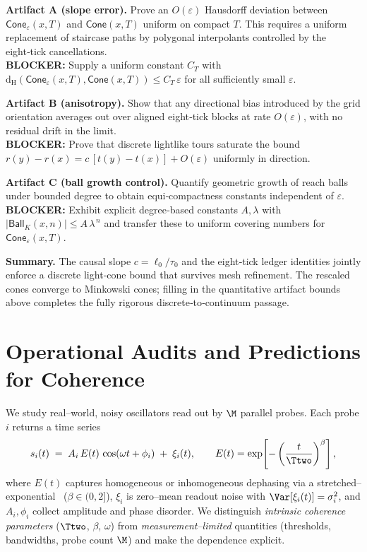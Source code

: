 \documentclass[12pt,a4paper]{article}
\theoremstyle{definition}
\theoremstyle{remark}
\begin{document}
\noindent\textbf{Artifact A (slope error).} Prove an \(O(\varepsilon)\) Hausdorff deviation between \(\mathsf{Cone}_\varepsilon(x,T)\) and \(\mathsf{Cone}(x,T)\) uniform on compact \(T\). This requires a uniform replacement of staircase paths by polygonal interpolants controlled by the eight‑tick cancellations. \\
\textbf{BLOCKER:} Supply a uniform constant \(C_T\) with \(\mathrm{d}_{\mathrm{H}}(\mathsf{Cone}_\varepsilon(x,T),\mathsf{Cone}(x,T))\le C_T\,\varepsilon\) for all sufficiently small \(\varepsilon\).

\noindent\textbf{Artifact B (anisotropy).} Show that any directional bias introduced by the grid orientation averages out over aligned eight‑tick blocks at rate \(O(\varepsilon)\), with no residual drift in the limit. \\
\textbf{BLOCKER:} Prove that discrete lightlike tours saturate the bound \(r(y)-r(x)=c\,[t(y)-t(x)]+O(\varepsilon)\) uniformly in direction.

\noindent\textbf{Artifact C (ball growth control).} Quantify geometric growth of reach balls under bounded degree to obtain equi‑compactness constants independent of \(\varepsilon\). \\
\textbf{BLOCKER:} Exhibit explicit degree‑based constants \(A,\lambda\) with \(|\mathsf{Ball}_K(x,n)|\le A\,\lambda^{\,n}\) and transfer these to uniform covering numbers for \(\mathsf{Cone}_\varepsilon(x,T)\).

\medskip
\noindent\textbf{Summary.} The causal slope \(c=\ell_0/\tau_0\) and the eight‑tick ledger identities jointly enforce a discrete light‑cone bound that survives mesh refinement. The rescaled cones converge to Minkowski cones; filling in the quantitative artifact bounds above completes the fully rigorous discrete‑to‑continuum passage.

\section{Operational Audits and Predictions for Coherence}
\label{sec:phenom}

We study real--world, noisy oscillators read out by \(\M\) parallel probes. Each probe \(i\) returns a time series
\begin{equation}
s_i(t) \;=\; A_i\,E(t)\,\cos(\omega t+\phi_i) \;+\; \xi_i(t),
\qquad
E(t)=\exp\!\left[-\left(\frac{t}{\Ttwo}\right)^{\beta}\right],
\label{eq:signal-model}
\end{equation}
where \(E(t)\) captures homogeneous or inhomogeneous dephasing via a stretched--exponential~\cite{Kohlrausch1854,WilliamsWatts1970} (\(\beta\in(0,2]\)), \(\xi_i\) is zero--mean readout noise with \(\Var[\xi_i(t)] = \sigma_i^2\), and \(A_i,\phi_i\) collect amplitude and phase disorder. We distinguish \emph{intrinsic coherence parameters} (\(\Ttwo\), \(\beta\), \(\omega\)) from \emph{measurement--limited} quantities (thresholds, bandwidths, probe count \(\M\)) and make the dependence explicit.
\end{document}
